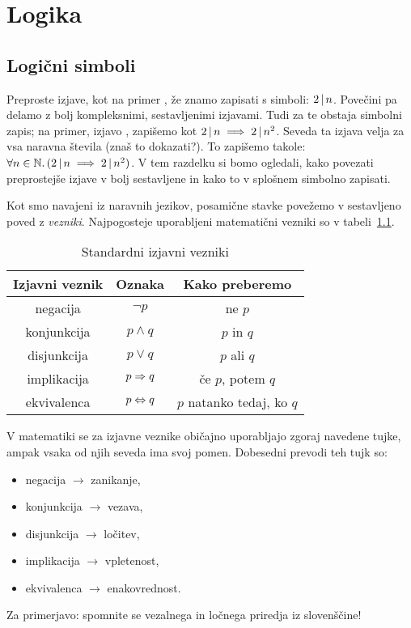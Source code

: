 \chapter{Logika}\label{poglavje:logika}





\section{Logični simboli}\label{razdelek:logicni-simboli}

Preproste izjave, kot na primer , že znamo zapisati s simboli: $2 \,|\, n$. Povečini pa delamo z bolj kompleksnimi, sestavljenimi izjavami. Tudi za te obstaja simbolni zapis; na primer, izjavo , zapišemo kot $2 \,|\, n \implies 2 \,|\, n^2$. Seveda ta izjava velja za vsa naravna števila (znaš to dokazati?). To zapišemo takole: $\forall n \in \mathbb{N} .\, (2 \,|\, n \implies 2 \,|\, n^2)$. V tem razdelku si bomo ogledali, kako povezati preprostejše izjave v bolj sestavljene in kako to v splošnem simbolno zapisati.

Kot smo navajeni iz naravnih jezikov, posamične stavke povežemo v sestavljeno poved z \emph{vezniki}. Najpogosteje uporabljeni matematični vezniki so v tabeli~\ref{tabela:standardni-izjavni-vezniki}.

\begin{table}[!ht]
\centering
\begin{tabular}{|ccc|}
\hline
\textbf{Izjavni veznik} & \textbf{Oznaka} & \textbf{Kako preberemo} \\
\hline
negacija & $\lnot{p}$ & ne $p$ \\
konjunkcija & $p \land q$ & $p$ in $q$ \\
disjunkcija & $p \lor q$ & $p$ ali $q$ \\
implikacija & $p \Rightarrow q$ & če $p$, potem $q$ \\
ekvivalenca & $p \Leftrightarrow q$ & $p$ natanko tedaj, ko $q$ \\
\hline
\end{tabular}
\caption{Standardni izjavni vezniki}\label{tabela:standardni-izjavni-vezniki}
\end{table}

\begin{opomba}
V matematiki se za izjavne veznike običajno uporabljajo zgoraj navedene tujke, ampak vsaka od njih seveda ima svoj pomen. Dobesedni prevodi teh tujk so:
\begin{itemize}
\item
negacija $\to$ zanikanje,
\item
konjunkcija $\to$ vezava,
\item
disjunkcija $\to$ ločitev,
\item
implikacija $\to$ vpletenost,
\item
ekvivalenca $\to$ enakovrednost.
\end{itemize}
Za primerjavo: spomnite se vezalnega in ločnega priredja iz slovenščine!
\end{opomba}

